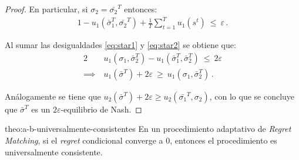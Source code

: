 \begin{proof}
En particular, si $\sigma_2 = \bar{\sigma_2}^T$ entonces:
\begin{alignat}{1}
\label{eq:star2}
-u_1(\bar{\sigma}_1^T, \bar{\sigma_2}^T) + \frac{1}{T} \sum_{t=1}^T u_1(s^t)\ \leq\ \varepsilon \,.
\end{alignat}

Al sumar las desigualdades \ref{eq:star1} y \ref{eq:star2} se obtiene que:
\begin{alignat}{2}
& u_1(\sigma_1, \bar{\sigma}_2^T) - u_1(\bar{\sigma}_1^T, \bar{\sigma}_2^T)\ \leq\ 2\varepsilon \\
\implies\ & u_1(\bar{\sigma}^T) + 2\varepsilon\ \geq\ u_1(\sigma_1, \bar{\sigma}_2^T) \,.
\end{alignat}

Análogamente se tiene que $u_2(\bar{\sigma}^T) + 2\varepsilon \geq u_2(\bar{\sigma_1}^T, \sigma_2)$, con lo que se concluye que $\bar{\sigma}^T$ es un $2\varepsilon$-equilibrio de Nash.
\end{proof}

\begin{reptheorem}{theo:a-b-universalmente-consistentes}
En un procedimiento adaptativo de \textit{Regret Matching}, si el \textit{regret} condicional converge a $0$, entonces el procedimiento es universalmente consistente.
\end{reptheorem}

